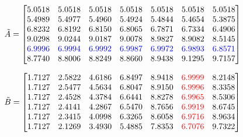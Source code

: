 \begin{equation*}
    \tilde{A} = 
    \begin{bmatrix}
        5.0518 & 5.0518 & 5.0518 & 5.0518 & 5.0518 &
        5.0518 & 5.0518  \\
        5.4989 & 5.4977 & 5.4960 & 5.4924 & 5.4844 &
        5.4654 & 5.3875 \\
        6.8232 & 6.8192 & 6.8150 & 6.8065 & 6.7871 &
        6.7334 & 6.4906 \\
        9.0298 & 9.0244 & 9.0187 & 9.0078 & 8.9827 &
        8.9082 & 8.5145 \\
        \color{blue}6.9996 & \color{blue}6.9994 & \color{blue}6.9992 &
        \color{blue}6.9987 & \color{blue}6.9972 & \color{blue}6.9893 &
        \color{blue}6.8571 \\
        8.7740 & 8.8006 & 8.8249 & 8.8660 & 8.9438 &
        9.1295 & 9.7157 \\
    \end{bmatrix}
\end{equation*}

\begin{equation*}
    \tilde{B} = 
    \begin{bmatrix}
        1.7127 & 2.5822 & 4.6186 & 6.8497 & 8.9418 &
        \color{red}6.9999 & 8.2148 \\
        1.7127 & 2.5477 & 4.5634 & 6.8047 & 8.9150 &
        \color{red}6.9996 & 8.3358 \\
        1.7127 & 2.4528   & 4.3784 & 6.6441 & 8.8278 &
        \color{red}6.9965 & 8.5306 \\
        1.7127 & 2.4141 & 4.2867 & 6.5470 & 8.7656 &
        \color{red}6.9919 & 8.6745 \\
        1.7127 & 2.3415 & 4.0998 & 6.3265 & 8.6058 &
        \color{red}6.9716 & 8.9634  \\
        1.7127 & 2.1269 & 3.4930 & 5.4885 & 7.8353 &
        \color{red}6.7076 & 9.7322 \\
    \end{bmatrix}
\end{equation*}
\normalsize


